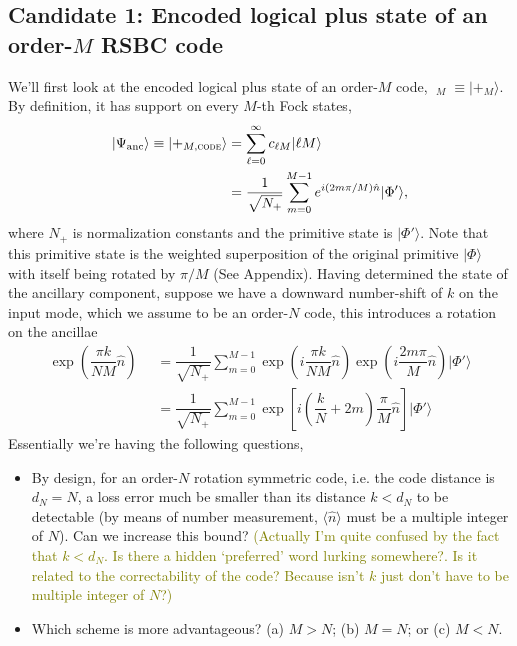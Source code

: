 \documentclass{article}
\DeclareMathOperator{\lgcplus}{|\bar{+}\rangle}
\DeclareMathOperator{\psianc}{|\Psi_{\text{anc}}\rangle}
\begin{document}
\subsection{Candidate 1: Encoded logical plus state of an order-$M$ RSBC code}
We'll first look at the encoded logical plus state of an order-$M$ code, $\lgcplus_M\equiv |+_M\rangle$. By definition, it has support on every $M$-th Fock states,
\begin{align}
    \psianc\equiv |+_{M,\textsc{code}}\rangle &= \sum_{\ell=0}^\infty c_{\ell M}|\ell M\rangle\\
    &=\dfrac{1}{\sqrt{N_+}}\sum_{m=0}^{M-1}e^{i(2m\pi/M)\hat{n}}|\Phi'\rangle,
\end{align}
where $N_+$ is normalization constants and the primitive state is $|\Phi'\rangle$. Note that this primitive state is the weighted superposition of the original primitive $|\Phi\rangle$ with itself being rotated by $\pi/M$ (See Appendix). Having determined the state of the ancillary component, suppose we have a downward number-shift of $k$ on the input mode, which we assume to be an order-$N$ code, this introduces a rotation on the ancillae
\begin{align}
    \exp\left(\dfrac{\pi k}{NM}\hat{n}\right)\psianc &= \dfrac{1}{\sqrt{N_+}}\sum_{m=0}^{M-1}\exp\left(i{\dfrac{\pi k}{NM}\hat{n}}\right)\exp\left({i\dfrac{2m\pi}{M}\hat{n}}\right)|\Phi'\rangle\\
    &=\dfrac{1}{\sqrt{N_+}}\sum_{m=0}^{M-1}\exp\left[i\left(\dfrac{k}{N}+2m\right)\dfrac{\pi}{M}\hat{n}\right]|\Phi'\rangle
\end{align}
Essentially we're having the following questions,
\begin{itemize}
    \item[\textcolor{red}{Q1.}] By design, for an order-$N$ rotation symmetric code, i.e. the code distance is $d_N=N$, a loss error much be smaller than its distance $k<d_N$ to be detectable (by means of number measurement, $\langle \hat{n}\rangle$ must be a multiple integer of $N$). Can we increase this bound? \textcolor{olive}{(Actually I'm quite confused by the fact that $k<d_N$. Is there a hidden `preferred' word lurking somewhere?. Is it related to the correctability of the code? Because isn't $k$ just don't have to be multiple integer of $N$?)}
    \item[\textcolor{red}{Q2.}] Which scheme is more advantageous? (a) $M>N$; (b) $M=N$; or (c) $M<N$. 
\end{itemize}
\end{document}
